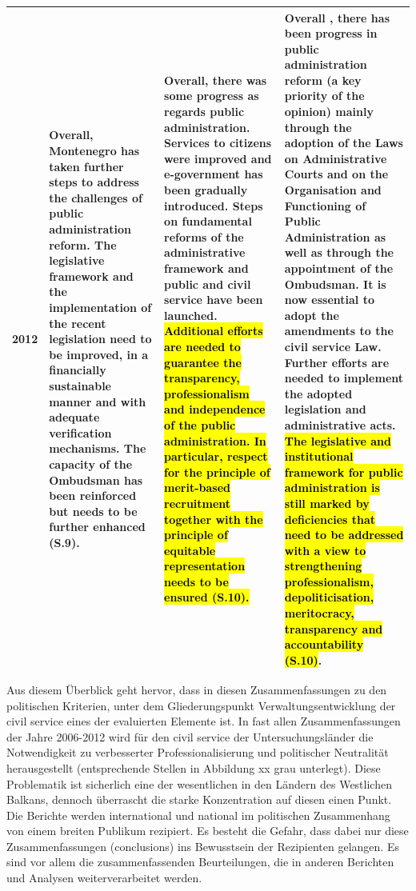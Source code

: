 \begin{longtable}[H]{|p{1cm}|L{45mm}|L{45mm}|L{45mm}|}
2012&\scriptsize{
Overall, Montenegro has taken further steps to address the challenges of public administration reform. The legislative framework and the implementation of the recent legislation need to be improved, in a financially sustainable manner and with adequate verification mechanisms. The capacity of the Ombudsman has been reinforced but needs to be further enhanced (S.9). }&\scriptsize{
Overall, there was some progress as regards public administration. Services to citizens were improved and e-government has been gradually introduced. Steps on fundamental reforms of the administrative framework and public and civil service have been launched. \hl{Additional efforts are needed to guarantee the transparency, professionalism and independence of the public administration. In particular, respect for the principle of merit-based recruitment together with the principle of equitable representation needs to be ensured (S.10).}}&\scriptsize{
Overall , there has been progress in public administration reform (a key priority of the opinion) mainly through the adoption of the Laws on Administrative Courts and on the Organisation and Functioning of Public Administration as well as through the appointment of the Ombudsman. It is now essential to adopt the amendments to the civil service Law. Further efforts are needed to implement the adopted legislation and administrative acts. \hl{The legislative and institutional framework for public administration is still marked by deficiencies that need to be addressed with a view to strengthening professionalism, depoliticisation, meritocracy, transparency and accountability (S.10)}}.\\\hline
\end{longtable}


\par
Aus diesem Überblick geht hervor, dass in diesen Zusammenfassungen zu den politischen Kriterien, unter dem Gliederungspunkt Verwaltungsentwicklung der civil service eines der evaluierten Elemente ist. In fast allen Zusammenfassungen der Jahre 2006-2012 wird für den civil service der Untersuchungsländer die Notwendigkeit zu verbesserter Professionalisierung und politischer Neutralität herausgestellt (entsprechende Stellen in Abbildung xx grau unterlegt). Diese Problematik ist sicherlich eine der wesentlichen in den Ländern des Westlichen Balkans, dennoch überrascht die starke Konzentration auf diesen einen Punkt. Die Berichte werden international und national im politischen Zusammenhang von einem breiten Publikum rezipiert. Es besteht die Gefahr, dass dabei nur diese Zusammenfassungen (conclusions) ins Bewusstsein der Rezipienten gelangen. Es sind vor allem die zusammenfassenden Beurteilungen, die in anderen Berichten und Analysen weiterverarbeitet werden.

